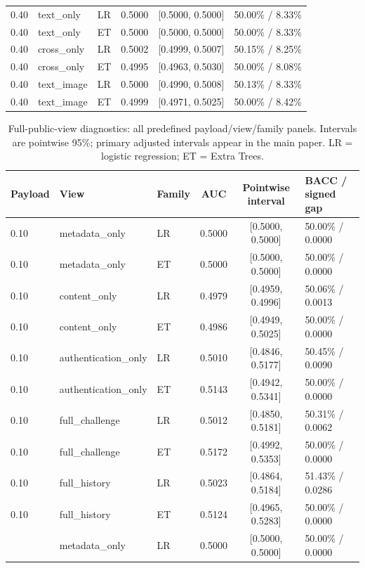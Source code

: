 \documentclass[journal]{IEEEtran}
\renewcommand{\arraystretch}{1.2}
\renewcommand{\arraystretch}{1.0}
\theoremstyle{definition}
\theoremstyle{game}
\renewcommand{\arraystretch}{1.5}
\begin{document}
\begin{table}[p]
\begin{tabular}{@{}lllccl@{}}
0.40 & text\_only & LR & 0.5000 & [0.5000, 0.5000] & 50.00\% / 8.33\%\\
0.40 & text\_only & ET & 0.5000 & [0.5000, 0.5000] & 50.00\% / 8.33\%\\
0.40 & cross\_only & LR & 0.5002 & [0.4999, 0.5007] & 50.15\% / 8.25\%\\
0.40 & cross\_only & ET & 0.4995 & [0.4963, 0.5030] & 50.00\% / 8.08\%\\
0.40 & text\_image & LR & 0.5000 & [0.4990, 0.5008] & 50.13\% / 8.33\%\\
0.40 & text\_image & ET & 0.4999 & [0.4971, 0.5025] & 50.00\% / 8.42\%\\
\bottomrule
\end{tabular}
\end{table}
\begin{table}[p]
\centering\footnotesize
\caption{Full-public-view diagnostics: all predefined payload/view/family panels. Intervals are pointwise 95\%; primary adjusted intervals appear in the main paper. LR = logistic regression; ET = Extra Trees.}
\label{tab:fullview-all-panels}
\setlength{\tabcolsep}{5pt}\renewcommand{\arraystretch}{1.04}
\begin{tabular}{@{}lllccl@{}}
\toprule
Payload & View & Family & AUC & Pointwise interval & BACC / signed gap\\
\midrule
0.10 & metadata\_only & LR & 0.5000 & [0.5000, 0.5000] & 50.00\% / 0.0000\\
0.10 & metadata\_only & ET & 0.5000 & [0.5000, 0.5000] & 50.00\% / 0.0000\\
0.10 & content\_only & LR & 0.4979 & [0.4959, 0.4996] & 50.06\% / 0.0013\\
0.10 & content\_only & ET & 0.4986 & [0.4949, 0.5025] & 50.00\% / 0.0000\\
0.10 & authentication\_only & LR & 0.5010 & [0.4846, 0.5177] & 50.45\% / 0.0090\\
0.10 & authentication\_only & ET & 0.5143 & [0.4942, 0.5341] & 50.00\% / 0.0000\\
0.10 & full\_challenge & LR & 0.5012 & [0.4850, 0.5181] & 50.31\% / 0.0062\\
0.10 & full\_challenge & ET & 0.5172 & [0.4992, 0.5353] & 50.00\% / 0.0000\\
0.10 & full\_history & LR & 0.5023 & [0.4864, 0.5184] & 51.43\% / 0.0286\\
0.10 & full\_history & ET & 0.5124 & [0.4965, 0.5283] & 50.00\% / 0.0000\\
\addlinespace[4pt]
0.20 & metadata\_only & LR & 0.5000 & [0.5000, 0.5000] & 50.00\% / 0.0000\\

\end{tabular}
\end{table}
\end{document}
